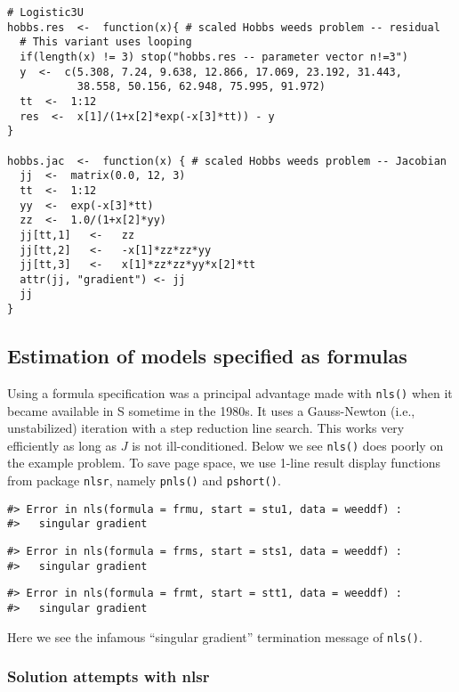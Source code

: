 \begin{verbatim}
# Logistic3U
hobbs.res  <-  function(x){ # scaled Hobbs weeds problem -- residual
  # This variant uses looping
  if(length(x) != 3) stop("hobbs.res -- parameter vector n!=3")
  y  <-  c(5.308, 7.24, 9.638, 12.866, 17.069, 23.192, 31.443, 
           38.558, 50.156, 62.948, 75.995, 91.972)
  tt  <-  1:12
  res  <-  x[1]/(1+x[2]*exp(-x[3]*tt)) - y
}

hobbs.jac  <-  function(x) { # scaled Hobbs weeds problem -- Jacobian
  jj  <-  matrix(0.0, 12, 3)
  tt  <-  1:12
  yy  <-  exp(-x[3]*tt)
  zz  <-  1.0/(1+x[2]*yy)
  jj[tt,1]   <-   zz
  jj[tt,2]   <-   -x[1]*zz*zz*yy
  jj[tt,3]   <-   x[1]*zz*zz*yy*x[2]*tt
  attr(jj, "gradient") <- jj
  jj
}
\end{verbatim}

\hypertarget{estimation-of-models-specified-as-formulas}{%
\subsection{Estimation of models specified as formulas}\label{estimation-of-models-specified-as-formulas}}

Using a formula specification was a principal advantage made
with \texttt{nls()} when it became available in S sometime in the 1980s. It uses a
Gauss-Newton (i.e., unstabilized) iteration with a step reduction line
search. This works very efficiently as long as \(J\) is not ill-conditioned.
Below we see \texttt{nls()} does poorly on the example problem. To save page space,
we use 1-line result display functions from package \texttt{nlsr}, namely \texttt{pnls()}
and \texttt{pshort()}.

\begin{verbatim}
#> Error in nls(formula = frmu, start = stu1, data = weeddf) : 
#>   singular gradient
\end{verbatim}

\begin{verbatim}
#> Error in nls(formula = frms, start = sts1, data = weeddf) : 
#>   singular gradient
\end{verbatim}

\begin{verbatim}
#> Error in nls(formula = frmt, start = stt1, data = weeddf) : 
#>   singular gradient
\end{verbatim}

Here we see the infamous ``singular gradient'' termination message of \texttt{nls()}.

\hypertarget{solution-attempts-with-nlsr}{%
\subsubsection{Solution attempts with nlsr}\label{solution-attempts-with-nlsr}}

